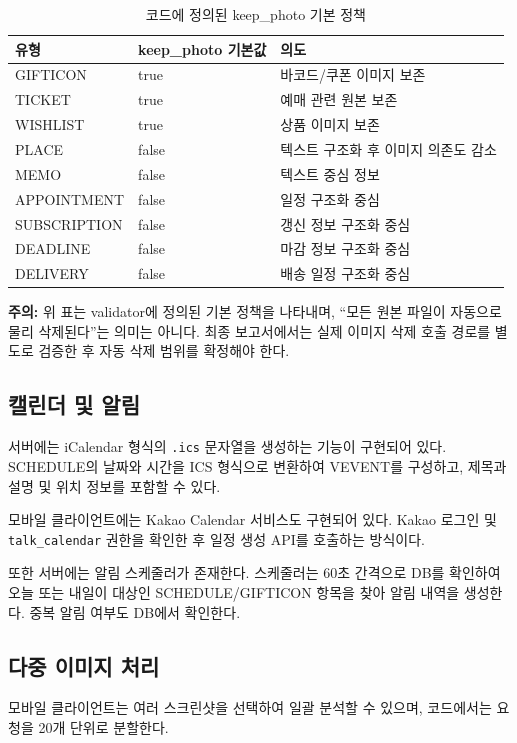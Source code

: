 \documentclass[11pt,a4paper]{article}
\begin{document}
\begin{table}[H]
\centering
\small
\begin{tabularx}{0.9\linewidth}{l l l}
\toprule
\textbf{유형} & \textbf{keep\_photo 기본값} & \textbf{의도}\\
\midrule
GIFTICON & true & 바코드/쿠폰 이미지 보존\\
TICKET & true & 예매 관련 원본 보존\\
WISHLIST & true & 상품 이미지 보존\\
PLACE & false & 텍스트 구조화 후 이미지 의존도 감소\\
MEMO & false & 텍스트 중심 정보\\
APPOINTMENT & false & 일정 구조화 중심\\
SUBSCRIPTION & false & 갱신 정보 구조화 중심\\
DEADLINE & false & 마감 정보 구조화 중심\\
DELIVERY & false & 배송 일정 구조화 중심\\
\bottomrule
\end{tabularx}
\caption{코드에 정의된 keep\_photo 기본 정책}
\end{table}

\textbf{주의:} 위 표는 validator에 정의된 기본 정책을 나타내며, ``모든 원본 파일이 자동으로 물리 삭제된다''는 의미는 아니다. 최종 보고서에서는 실제 이미지 삭제 호출 경로를 별도로 검증한 후 자동 삭제 범위를 확정해야 한다.

\subsection{캘린더 및 알림}

서버에는 iCalendar 형식의 \texttt{.ics} 문자열을 생성하는 기능이 구현되어 있다. SCHEDULE의 날짜와 시간을 ICS 형식으로 변환하여 VEVENT를 구성하고, 제목과 설명 및 위치 정보를 포함할 수 있다.

모바일 클라이언트에는 Kakao Calendar 서비스도 구현되어 있다. Kakao 로그인 및 \texttt{talk\_calendar} 권한을 확인한 후 일정 생성 API를 호출하는 방식이다.

또한 서버에는 알림 스케줄러가 존재한다. 스케줄러는 60초 간격으로 DB를 확인하여 오늘 또는 내일이 대상인 SCHEDULE/GIFTICON 항목을 찾아 알림 내역을 생성한다. 중복 알림 여부도 DB에서 확인한다.

\subsection{다중 이미지 처리}

모바일 클라이언트는 여러 스크린샷을 선택하여 일괄 분석할 수 있으며, 코드에서는 요청을 20개 단위로 분할한다.
\end{document}
